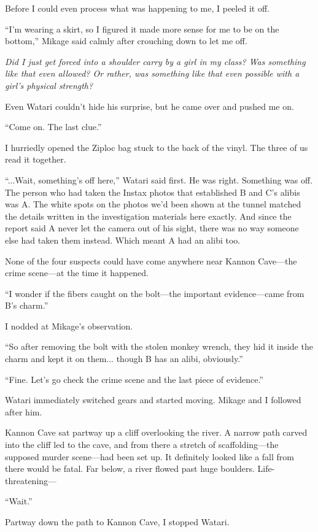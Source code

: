 \documentclass[
    a4paper,
    12pt,
    twoside,
    openany,
    UTF8,
    fontset=windows
]{ctexbook}
\begin{document}
Before I could even process what was happening to me, I peeled it off.

``I'm wearing a skirt, so I figured it made more sense for me to be on the bottom,'' Mikage said calmly after crouching down to let me off.

\textit{Did I just get forced into a shoulder carry by a girl in my class? Was something like that even allowed? Or rather, was something like that even possible with a girl's physical strength?}

Even Watari couldn't hide his surprise, but he came over and pushed me on.

``Come on. The last clue.''

I hurriedly opened the Ziploc bag stuck to the back of the vinyl. The three of us read it together.

``...Wait, something's off here,'' Watari said first. He was right. Something was off. The person who had taken the Instax photos that established B and C's alibis was A. The white spots on the photos we'd been shown at the tunnel matched the details written in the investigation materials here exactly. And since the report said A never let the camera out of his sight, there was no way someone else had taken them instead. Which meant A had an alibi too.

None of the four suspects could have come anywhere near Kannon Cave---the crime scene---at the time it happened.

``I wonder if the fibers caught on the bolt---the important evidence---came from B's charm.''

I nodded at Mikage's observation.

``So after removing the bolt with the stolen monkey wrench, they hid it inside the charm and kept it on them... though B has an alibi, obviously.''

``Fine. Let's go check the crime scene and the last piece of evidence.''

Watari immediately switched gears and started moving. Mikage and I followed after him.

Kannon Cave sat partway up a cliff overlooking the river. A narrow path carved into the cliff led to the cave, and from there a stretch of scaffolding---the supposed murder scene---had been set up. It definitely looked like a fall from there would be fatal. Far below, a river flowed past huge boulders. Life-threatening---

``Wait.''

Partway down the path to Kannon Cave, I stopped Watari.
\end{document}
